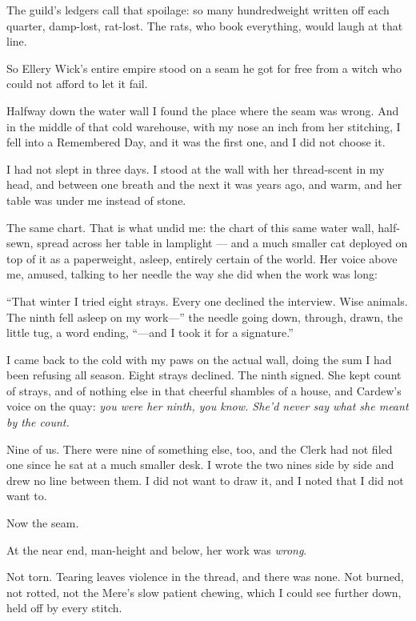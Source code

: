 The guild's ledgers call that spoilage: so many hundredweight written off each quarter, damp-lost, rat-lost. The rats, who book everything, would laugh at that line.

So Ellery Wick's entire empire stood on a seam he got for free from a witch who could not afford to let it fail.

Halfway down the water wall I found the place where the seam was wrong. And in the middle of that cold warehouse, with my nose an inch from her stitching, I fell into a Remembered Day, and it was the first one, and I did not choose it.

I had not slept in three days. I stood at the wall with her thread-scent in my head, and between one breath and the next it was years ago, and warm, and her table was under me instead of stone.

The same chart. That is what undid me: the chart of this same water wall, half-sewn, spread across her table in lamplight --- and a much smaller cat deployed on top of it as a paperweight, asleep, entirely certain of the world. Her voice above me, amused, talking to her needle the way she did when the work was long:

``That winter I tried eight strays. Every one declined the interview. Wise animals. The ninth fell asleep on my work---'' the needle going down, through, drawn, the little tug, a word ending, ``---and I took it for a signature.''

I came back to the cold with my paws on the actual wall, doing the sum I had been refusing all season. Eight strays declined. The ninth signed. She kept count of strays, and of nothing else in that cheerful shambles of a house, and Cardew's voice on the quay: \emph{you were her ninth, you know. She'd never say what she meant by the count.}

Nine of us. There were nine of something else, too, and the Clerk had not filed one since he sat at a much smaller desk. I wrote the two nines side by side and drew no line between them. I did not want to draw it, and I noted that I did not want to.

\scenebreak

Now the seam.

At the near end, man-height and below, her work was \emph{wrong}.

Not torn. Tearing leaves violence in the thread, and there was none. Not burned, not rotted, not the Mere's slow patient chewing, which I could see further down, held off by every stitch.

